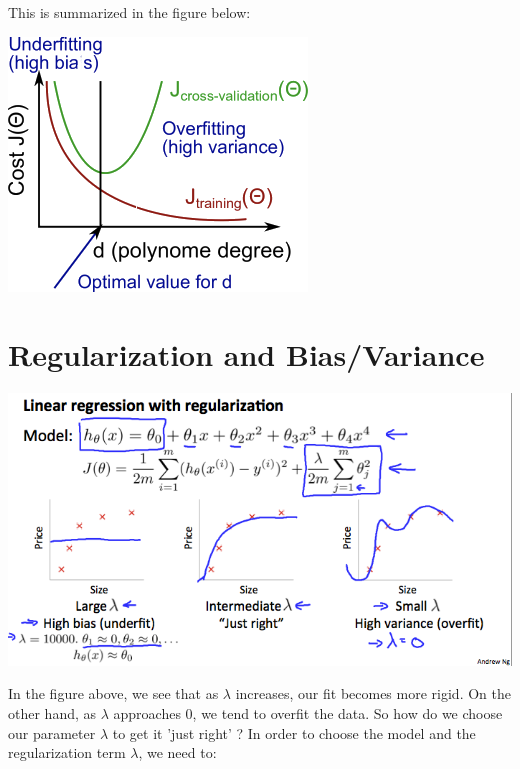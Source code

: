 \documentclass[10pt,a4paper,UTF8]{article}
\begin{document}
This is summarized in the figure below:
\begin{center}
\includegraphics[width=.9\linewidth]{../../img/computer_ng/20171015biasandvariance.png}
\end{center}

\section{Regularization and Bias/Variance}
\label{sec:org9b8a340}



\begin{center}
\includegraphics[width=.9\linewidth]{../../img/computer_ng/20171015biasandvarianceRegularized.png}
\end{center}

In the figure above, we see that as \(\lambda\) increases, our fit becomes more rigid. On the other hand, as \(\lambda\) approaches 0, we tend to  overfit the data. So how do we choose our parameter \(\lambda\) to get it 'just right' ? In order to choose the model and the regularization term \(\lambda\), we need to:
\end{document}
